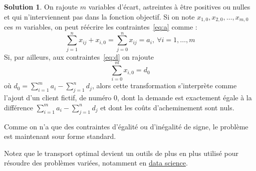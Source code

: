 \documentclass[a4paper,francais]{article}
\theoremstyle{definition}
\newtheorem*{solution}{Solution}
\begin{document}
\begin{solution}
  On rajoute $m$ variables d'écart, astreintes à être positives ou nulles
  et qui n'interviennent pas dans la fonction objectif.
  Si on note $x_{1,0}, x_{2,0}, \dots, x_{m,0}$ ces $m$ variables, on peut réécrire
  les contraintes~\ref{eq:a} comme :
  \[
  \sum_{j = 1}^n x_{ij} + x_{i,0} = \sum_{j = 0}^n x_{ij} = a_i, \ \forall i = 1, \dots, m
  \]
  Si, par ailleurs, aux contraintes~\ref{eq:d} on rajoute
  \[
  \sum_{i = 0}^m x_{i,0} = d_0
  \]
  où $d_0 = \sum_{i = 1}^m a_i - \sum_{j = 1}^n d_j$, alors cette transformation s'interprète
  comme l'ajout d'un client fictif, de numéro $0$, dont la demande est exactement égale à
  la différence $\sum_{i = 1}^m a_i - \sum_{j = 1}^n d_j$ et dont les coûts d'acheminement
  sont nuls.

  Comme on n'a que des contraintes d'égalité ou d'inégalité de signe, le problème est
  maintenant sour forme standard. 
\end{solution}

Notez que le transport optimal devient un outils de plus en plus utilisé pour résoudre
des problèmes variées, notamment en
\href{https://weave.eu/le-transport-optimal-un-couteau-suisse-pour-la-data-science/}{data science}. 
\end{document}
